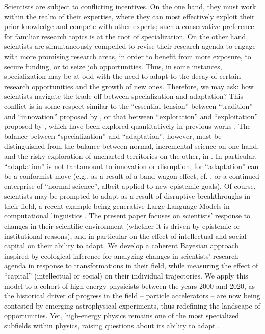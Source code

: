 \documentclass{article}
\begin{document}
Scientists are subject to conflicting incentives. On the one hand, they must work within the realm of their expertise, where they can most effectively exploit their prior knowledge and compete with other experts; such a conservative preference for familiar research topics is at the root of specialization. On the other hand, scientists are simultaneously compelled to revise their research agenda to engage with more promising research areas, in order to benefit from more exposure, to secure funding, or to seize job opportunities. Thus, in some instances, specialization may be at odd with the need to adapt to the decay of certain research opportunities and the growth of new ones. Therefore, we may ask: how scientists navigate the trade-off between specialization and adaptation? This conflict is in some respect similar to the ``essential tension'' between ``tradition'' and ``innovation'' proposed by \citet{Kuhn1997}, or that between ``exploration'' and ``exploitation'' proposed by \citet{March1991}, which have been explored quantitatively in previous works \citep{Foster2015,Jia2017,Aleta2019,Zeng2019,Tripodi2020,Chakresh2023,Feifan2023}%
. The balance between ``specialization'' and ``adaptation'', however, must be distinguished from the balance between normal, incremental science on one hand, and the risky exploration of uncharted territories on the other, in \citet{Foster2015}. In particular, ``adaptation'' is not tantamount to innovation or disruption, for ``adaptation'' can be a conformist move (e.g., as a result of a band-wagon effect, cf. \citealt{Fujimura1988}, or a continued enterprise of ``normal science'', albeit applied to new epistemic goals). Of course, scientists may be prompted to adapt as a result of disruptive breakthroughs in their field, a recent example being generative Large Language Models in computational linguistics \citep{Naomi2023}. The present paper focuses on scientists' response to changes in their scientific environment (whether it is driven by epistemic or institutional reasons), and in particular on the effect of intellectual and social capital on their ability to adapt. We develop a coherent Bayesian approach inspired by ecological inference for analyzing changes in scientists' research agenda in response to transformations in their field, while measuring the effect of ``capital'' (intellectual or social) on their individual trajectories. We apply this model to a cohort of high-energy physicists between the years 2000 and 2020, as the historical driver of progress in the field -- particle accelerators -- are now being contested by emerging astrophysical experiments, thus redefining the landscape of opportunities. Yet, high-energy physics remains one of the most specialized subfields within physics, raising questions about its ability to adapt \citep{Battiston2019,Aleta2019}.
\end{document}
